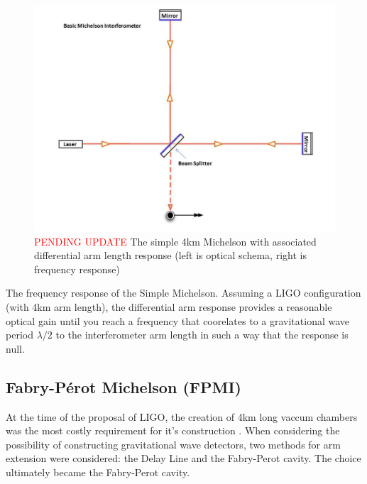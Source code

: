 \begin{figure}[H]
  \begin{center}
    \includegraphics[width=\textwidth]{figs/INTRO/tempsub_Basic_michelson_labeled.jpg}
  \end{center}
  \caption{\textcolor{red}{PENDING UPDATE} The simple 4km Michelson with associated differential arm length response (left is optical schema, right is frequency response)}
  \label{fig:simple_michelson}
\end{figure}

The frequency response of the Simple Michelson. Assuming a LIGO configuration (with 4km arm length), the differential arm response provides a reasonable optical gain until you reach a frequency that coorelates to a gravitational wave period $\lambda / 2$ to the interferometer arm length in such a way that the response is null.

\subsection{Fabry-P\'{e}rot Michelson (FPMI)}
At the time of the proposal of LIGO, the creation of 4km long vaccum chambers was the most costly requirement for it's construction \cite{?}. When considering the possibility of constructing gravitational wave detectors, two methods for arm extension were considered: the Delay Line and the Fabry-Perot cavity. The choice ultimately became the Fabry-Perot cavity.

